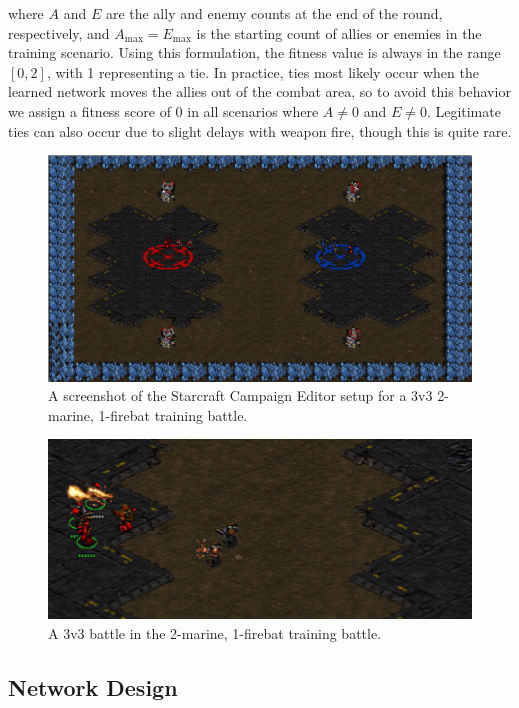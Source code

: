 \documentclass[10pt,a4paper,twocolumn]{article}
\begin{document}
where $A$ and $E$ are the ally and enemy counts at the end of the round, respectively, and $A_\mathrm{max} = E_\mathrm{max}$ is the starting count of allies or enemies in the training scenario. Using this formulation, the fitness value is always in the range $[0,2]$, with 1 representing a tie. In practice, ties most likely occur when the learned network moves the allies out of the combat area, so to avoid this behavior we assign a fitness score of 0 in all scenarios where $A \neq 0$ and $E \neq 0$. Legitimate ties can also occur due to slight delays with weapon fire, though this is quite rare.

\begin{figure}
\includegraphics[scale=.28]{figures/mf_setup.png}
\caption{A screenshot of the Starcraft Campaign Editor setup for a 3v3 2-marine, 1-firebat training battle.}
\end{figure}


\begin{figure}
\includegraphics[scale=.34]{figures/mf_battle_small.png}
\caption{A 3v3 battle in the 2-marine, 1-firebat training battle.}
\label{fig:training_setup}
\end{figure}

\subsection{Network Design}
\label{sec:net_design}
\end{document}
